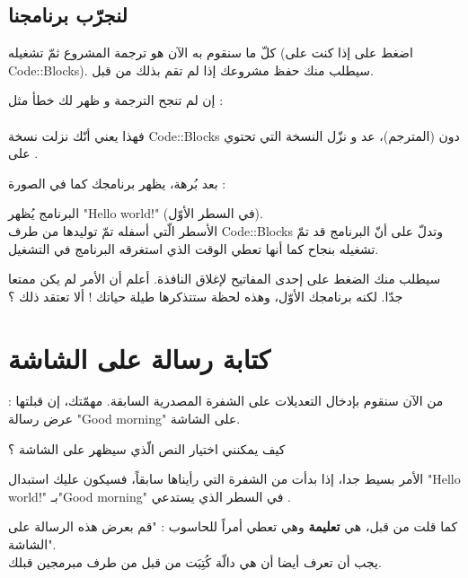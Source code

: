 \subsection{لنجرّب برنامجنا}
كلّ ما سنقوم به الآن هو ترجمة المشروع ثمّ تشغيله (اضغط على
 إذا كنت على
\textenglish{Code::Blocks}).
سيطلب منك حفظ مشروعك إذا لم تقم بذلك من قبل.

\begin{critical}
  إن لم تنجح الترجمة و ظهر لك خطأ مثل :\\
\\
فهذا يعني أنّك نزلت نسخة
\textenglish{Code::Blocks}
 دون
 (المترجم)، عد و نزّل النسخة التي تحتوي على
.
\end{critical}

بعد بُرهة، يظهر برنامجك كما في الصورة :

البرنامج يُظهر
"\textenglish{Hello world!}"
 (في السطر الأوّل).\\
الأسطر الّتي أسفله تمّ توليدها من طرف
\textenglish{Code::Blocks}
 وتدلّ على أنّ البرنامج قد تمّ تشغيله بنجاح كما أنها تعطي الوقت الذي استغرقه البرنامج في التشغيل.

 سيطلب منك الضغط على إحدى المفاتيح لإغلاق النافذة. أعلم أن الأمر لم يكن ممتعا جدّا. لكنه برنامجك الأوّل، وهذه لحظة ستتذكرها طيلة حياتك ! ألا تعتقد ذلك ؟

\section{كتابة رسالة على الشاشة}
من الآن سنقوم بإدخال التعديلات على الشفرة المصدرية السابقة. مهمّتك، إن قبلتها : عرض رسالة
"\textenglish{Good morning}"
 على الشاشة.

\begin{question}
  كيف يمكنني اختيار النص الّذي سيظهر على الشاشة ؟
\end{question}

الأمر بسيط جدا، إذا بدأت من الشفرة التي رأيناها سابقاً، فسيكون عليك استبدال
"\textenglish{Hello world!}"
 بـ"\textenglish{Good morning}"
 في السطر الذي يستدعي
.

كما قلت من قبل،
 هي
\textbf{تعليمة}
 وهي تعطي أمراً للحاسوب : "قم بعرض هذه الرسالة على الشاشة".\\
يجب أن تعرف أيضا أن
 هي دالّة كُتِبَت من قبل من طرف مبرمجين قبلك.

